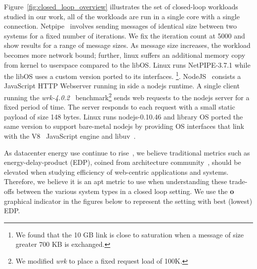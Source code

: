 Figure~\ref{fig:closed_loop_overview} illustrates the set of closed-loop workloads studied in our work, all of the workloads are run in a single core with a single connection. Netpipe~\cite{snell1996netpipe} involves sending messages of identical size between two systems for a fixed number of iterations. We fix the iteration count at 5000 and show results for a range of message sizes. As message size increases, the workload becomes more network bound; further, linux suffers an additional memory copy from kernel to userspace compared to the libOS. Linux runs NetPIPE-3.7.1 while the libOS uses a custom version ported to its interfaces. \footnote{We found that the 10 GB link is close to saturation when a message of size greater 700 KB is exchanged.}. NodeJS~\cite{nodejs} consists a JavaScript HTTP Webserver running in side a nodejs runtime. A single client running the \textit{wrk-4.0.2}~\cite{wrk} benchmark\footnote{We modified \textit{wrk} to place a fixed request load of 100K.} sends web requests to the nodejs server for a fixed period of time. The server responds to each request with a small static payload of size 148 bytes. Linux runs nodejs-0.10.46 and library OS ported the same version to support bare-metal nodejs by providing OS interfaces that link with the V8~\cite{v8} JavaScript engine and libuv~\cite{libuv}. 

As datacenter energy use continue to rise~\cite{gupta2020chasing, NLP-energy,warehouse-power,nature1}, we believe traditional metrics such as energy-delay-product (EDP), coined from architecture community~\cite{573184,10.1109/40.888701}, should be elevated when studying efficiency of web-centric applications and systems. Therefore, we believe it is an apt metric to use when understanding these trade-offs between the various system types in a closed loop setting. We use the {\larger[4]\textbf{o}} graphical indicator in the figures below to represent the setting with best (lowest) EDP.



